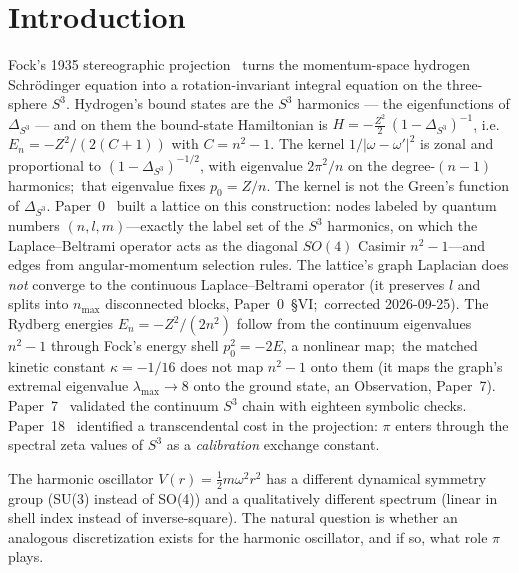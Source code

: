 \documentclass[twocolumn,pra,amsmath,amssymb,superscriptaddress]{revtex4-2}
\begin{document}
\maketitle

\section{Introduction}

Fock's 1935 stereographic projection~\cite{fock1935} turns the
momentum-space hydrogen Schr\"odinger equation into a rotation-invariant
integral equation on the three-sphere $S^3$.  Hydrogen's bound states
are the $S^3$ harmonics --- the eigenfunctions of $\Delta_{S^3}$ --- and
on them the bound-state Hamiltonian is
$H = -\tfrac{Z^2}{2}\,(1 - \Delta_{S^3})^{-1}$, i.e.\
$E_n = -Z^2/(2(C+1))$ with $C = n^2 - 1$.  The kernel
$1/|\omega - \omega'|^2$ is zonal and proportional to
$(1 - \Delta_{S^3})^{-1/2}$, with eigenvalue $2\pi^2/n$ on the
degree-$(n-1)$ harmonics;\ that eigenvalue fixes $p_0 = Z/n$.  The
kernel is not the Green's function of $\Delta_{S^3}$.  Paper~0~\cite{paper0} built a lattice on this
construction: nodes labeled by quantum numbers $(n, l, m)$---exactly
the label set of the $S^3$ harmonics, on which the Laplace--Beltrami
operator acts as the diagonal $SO(4)$ Casimir $n^2 - 1$---and edges
from angular-momentum selection rules.  The lattice's graph Laplacian
does \emph{not} converge to the continuous Laplace--Beltrami operator
(it preserves $l$ and splits into $n_{\max}$ disconnected blocks,
Paper~0~\S VI;\ corrected 2026-09-25).  The Rydberg energies
$E_n = -Z^2/(2n^2)$ follow from the continuum eigenvalues $n^2 - 1$
through Fock's energy shell $p_0^2 = -2E$, a nonlinear map;\ the matched
kinetic constant $\kappa = -1/16$ does not map $n^2 - 1$ onto them (it
maps the graph's extremal eigenvalue $\lambda_{\max} \to 8$ onto the
ground state, an Observation, Paper~7).  Paper~7~\cite{paper7} validated
the continuum $S^3$ chain with eighteen symbolic checks.
Paper~18~\cite{paper18} identified a transcendental cost in the
projection: $\pi$ enters through the spectral zeta values of $S^3$
as a \emph{calibration} exchange constant.

The harmonic oscillator $V(r) = \frac{1}{2} m \omega^2 r^2$ has a
different dynamical symmetry group (SU(3) instead of SO(4)) and a
qualitatively different spectrum (linear in shell index instead of
inverse-square).  The natural question is whether an analogous
discretization exists for the harmonic oscillator, and if so, what
role $\pi$ plays.
\end{document}
